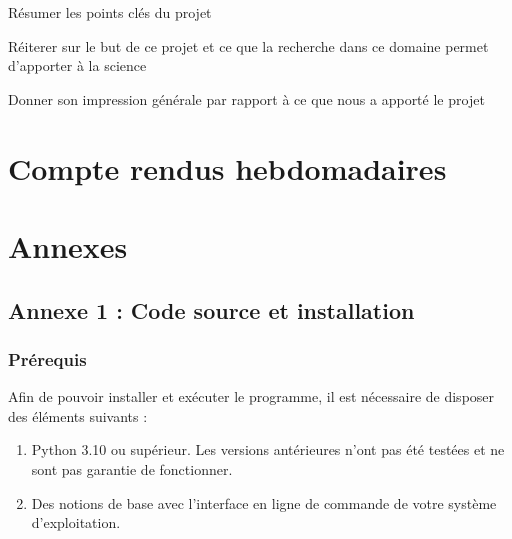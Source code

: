 \documentclass[12pt]{scrreprt} %
\begin{document}
Résumer les points clés du projet

Réiterer sur le but de ce projet et ce que la recherche dans ce domaine permet d'apporter à la science

Donner son impression générale par rapport à ce que nous a apporté le projet

\newpage %
\renewcommand{\bibname}{Bibliographie} %


\chapter*{Compte rendus hebdomadaires}

\chapter*{Annexes}

\section*{Annexe 1 : Code source et installation}

\subsection*{Prérequis}

Afin de pouvoir installer et exécuter le programme, il est nécessaire de disposer des éléments suivants :
\begin{enumerate}
    \item Python 3.10 ou supérieur. Les versions antérieures n'ont pas été testées et ne sont pas garantie de fonctionner.
    \item Des notions de base avec l'interface en ligne de commande de votre système d'exploitation.
\end{enumerate}
\end{document}

